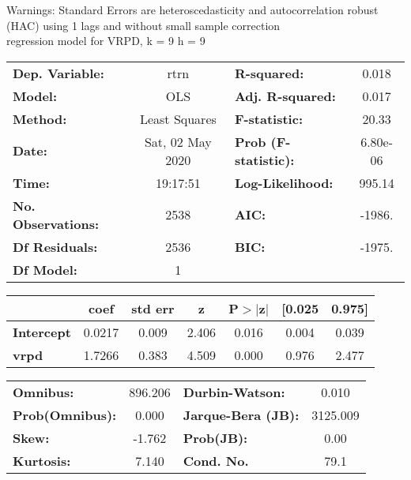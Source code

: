 Warnings: \newline
 [1] Standard Errors are heteroscedasticity and autocorrelation robust (HAC) using 1 lags and without small sample correction\\ 

regression model for VRPD, k = 9 h = 9\begin{center}
\begin{tabular}{lclc}
\toprule
\textbf{Dep. Variable:}    &       rtrn       & \textbf{  R-squared:         } &     0.018   \\
\textbf{Model:}            &       OLS        & \textbf{  Adj. R-squared:    } &     0.017   \\
\textbf{Method:}           &  Least Squares   & \textbf{  F-statistic:       } &     20.33   \\
\textbf{Date:}             & Sat, 02 May 2020 & \textbf{  Prob (F-statistic):} &  6.80e-06   \\
\textbf{Time:}             &     19:17:51     & \textbf{  Log-Likelihood:    } &    995.14   \\
\textbf{No. Observations:} &        2538      & \textbf{  AIC:               } &    -1986.   \\
\textbf{Df Residuals:}     &        2536      & \textbf{  BIC:               } &    -1975.   \\
\textbf{Df Model:}         &           1      & \textbf{                     } &             \\
\bottomrule
\end{tabular}
\begin{tabular}{lcccccc}
                   & \textbf{coef} & \textbf{std err} & \textbf{z} & \textbf{P$> |$z$|$} & \textbf{[0.025} & \textbf{0.975]}  \\
\midrule
\textbf{Intercept} &       0.0217  &        0.009     &     2.406  &         0.016        &        0.004    &        0.039     \\
\textbf{vrpd}      &       1.7266  &        0.383     &     4.509  &         0.000        &        0.976    &        2.477     \\
\bottomrule
\end{tabular}
\begin{tabular}{lclc}
\textbf{Omnibus:}       & 896.206 & \textbf{  Durbin-Watson:     } &    0.010  \\
\textbf{Prob(Omnibus):} &   0.000 & \textbf{  Jarque-Bera (JB):  } & 3125.009  \\
\textbf{Skew:}          &  -1.762 & \textbf{  Prob(JB):          } &     0.00  \\
\textbf{Kurtosis:}      &   7.140 & \textbf{  Cond. No.          } &     79.1  \\
\bottomrule
\end{tabular}
\end{center}

